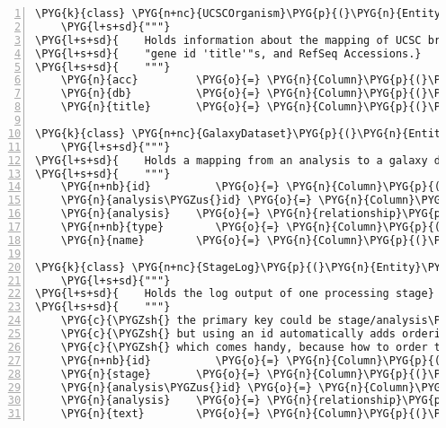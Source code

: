 \begin{Verbatim}[commandchars=\\\{\},numbers=left,firstnumber=1,stepnumber=5]
\PYG{k}{class} \PYG{n+nc}{UCSCOrganism}\PYG{p}{(}\PYG{n}{Entity}\PYG{p}{)}\PYG{p}{:}
    \PYG{l+s+sd}{"""}
\PYG{l+s+sd}{    Holds information about the mapping of UCSC browser "db" names to}
\PYG{l+s+sd}{    "gene id 'title'"s, and RefSeq Accessions.}
\PYG{l+s+sd}{    """}
    \PYG{n}{acc}         \PYG{o}{=} \PYG{n}{Column}\PYG{p}{(}\PYG{n}{String}\PYG{p}{,} \PYG{n}{primary\PYGZus{}key}\PYG{o}{=}\PYG{n+nb+bp}{True}\PYG{p}{)}
    \PYG{n}{db}          \PYG{o}{=} \PYG{n}{Column}\PYG{p}{(}\PYG{n}{String}\PYG{p}{,} \PYG{n}{unique}\PYG{o}{=}\PYG{n+nb+bp}{True}\PYG{p}{)}
    \PYG{n}{title}       \PYG{o}{=} \PYG{n}{Column}\PYG{p}{(}\PYG{n}{String}\PYG{p}{,} \PYG{n}{unique}\PYG{o}{=}\PYG{n+nb+bp}{True}\PYG{p}{)}

\PYG{k}{class} \PYG{n+nc}{GalaxyDataset}\PYG{p}{(}\PYG{n}{Entity}\PYG{p}{)}\PYG{p}{:}
    \PYG{l+s+sd}{"""}
\PYG{l+s+sd}{    Holds a mapping from an analysis to a galaxy dataset id}
\PYG{l+s+sd}{    """}
    \PYG{n+nb}{id}          \PYG{o}{=} \PYG{n}{Column}\PYG{p}{(}\PYG{n}{String}\PYG{p}{,} \PYG{n}{primary\PYGZus{}key}\PYG{o}{=}\PYG{n+nb+bp}{True}\PYG{p}{)}
    \PYG{n}{analysis\PYGZus{}id} \PYG{o}{=} \PYG{n}{Column}\PYG{p}{(}\PYG{n}{Integer}\PYG{p}{,} \PYG{n}{ForeignKey}\PYG{p}{(}\PYG{n}{Analysis}\PYG{o}{.}\PYG{n}{id}\PYG{p}{)}\PYG{p}{,} \PYG{n}{primary\PYGZus{}key}\PYG{o}{=}\PYG{n+nb+bp}{True}\PYG{p}{)}
    \PYG{n}{analysis}    \PYG{o}{=} \PYG{n}{relationship}\PYG{p}{(}\PYG{n}{Analysis}\PYG{p}{,} \PYG{n}{backref}\PYG{o}{=}\PYG{n}{backref}\PYG{p}{(}\PYG{l+s}{"}\PYG{l+s}{galaxy\PYGZus{}datasets}\PYG{l+s}{"}\PYG{p}{)}\PYG{p}{)}
    \PYG{n+nb}{type}        \PYG{o}{=} \PYG{n}{Column}\PYG{p}{(}\PYG{n}{String}\PYG{p}{)}
    \PYG{n}{name}        \PYG{o}{=} \PYG{n}{Column}\PYG{p}{(}\PYG{n}{String}\PYG{p}{)}

\PYG{k}{class} \PYG{n+nc}{StageLog}\PYG{p}{(}\PYG{n}{Entity}\PYG{p}{)}\PYG{p}{:}
    \PYG{l+s+sd}{"""}
\PYG{l+s+sd}{    Holds the log output of one processing stage}
\PYG{l+s+sd}{    """}
    \PYG{c}{\PYGZsh{} the primary key could be stage/analysis\PYGZus{}id}
    \PYG{c}{\PYGZsh{} but using an id automatically adds ordering}
    \PYG{c}{\PYGZsh{} which comes handy, because how to order the stages otherwise ?}
    \PYG{n+nb}{id}          \PYG{o}{=} \PYG{n}{Column}\PYG{p}{(}\PYG{n}{Integer}\PYG{p}{,} \PYG{n}{primary\PYGZus{}key}\PYG{o}{=}\PYG{n+nb+bp}{True}\PYG{p}{)}
    \PYG{n}{stage}       \PYG{o}{=} \PYG{n}{Column}\PYG{p}{(}\PYG{n}{String}\PYG{p}{)}
    \PYG{n}{analysis\PYGZus{}id} \PYG{o}{=} \PYG{n}{Column}\PYG{p}{(}\PYG{n}{Integer}\PYG{p}{,} \PYG{n}{ForeignKey}\PYG{p}{(}\PYG{n}{Analysis}\PYG{o}{.}\PYG{n}{id}\PYG{p}{)}\PYG{p}{)}
    \PYG{n}{analysis}    \PYG{o}{=} \PYG{n}{relationship}\PYG{p}{(}\PYG{n}{Analysis}\PYG{p}{,} \PYG{n}{backref}\PYG{o}{=}\PYG{n}{backref}\PYG{p}{(}\PYG{l+s}{"}\PYG{l+s}{stage\PYGZus{}logs}\PYG{l+s}{"}\PYG{p}{)}\PYG{p}{)}
    \PYG{n}{text}        \PYG{o}{=} \PYG{n}{Column}\PYG{p}{(}\PYG{n}{Text}\PYG{p}{)}
\end{Verbatim}


